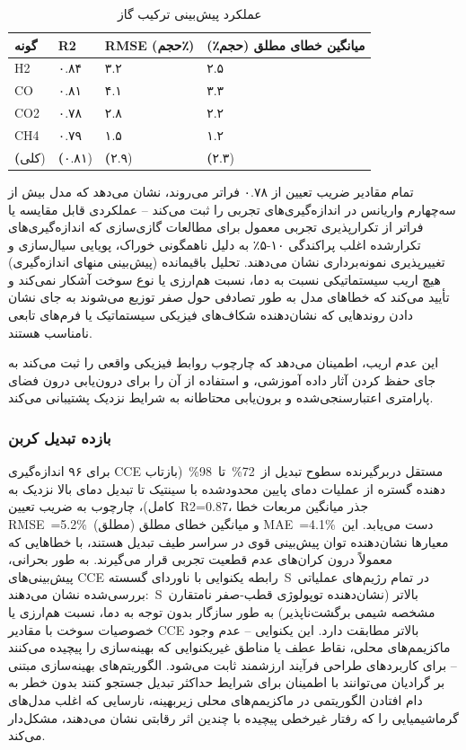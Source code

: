 \documentclass[12pt, a4paper]{article}
\begin{document}
\begin{table}[t]
\centering
\small
\caption{عملکرد پیش‌بینی ترکیب گاز}
\begin{tabularx}{\linewidth}{@{}*{4}{>{\raggedleft\arraybackslash}X}@{}}
\toprule
گونه & R2 & RMSE (حجم٪) & میانگین خطای مطلق (حجم٪) \\
\midrule
H2 & ۰.۸۴ & ۳.۲ & ۲.۵ \\
CO & ۰.۸۱ & ۴.۱ & ۳.۳ \\
CO2 & ۰.۷۸ & ۲.۸ & ۲.۲ \\
CH4 & ۰.۷۹ & ۱.۵ & ۱.۲ \\
\textbf(کلی) & \textbf(۰.۸۱) & \textbf(۲.۹) & \textbf(۲.۳) \\
\bottomrule
\end{tabularx}
\end{table}


تمام مقادیر ضریب تعیین از ۰.۷۸ فراتر می‌روند، نشان می‌دهد که مدل بیش از سه‌چهارم واریانس در اندازه‌گیری‌های تجربی را ثبت می‌کند – عملکردی قابل مقایسه یا فراتر از تکرارپذیری تجربی معمول برای مطالعات گازی‌سازی که اندازه‌گیری‌های تکرارشده اغلب پراکندگی ۱۰-۵٪ به دلیل ناهمگونی خوراک، پویایی سیال‌سازی و تغییرپذیری نمونه‌برداری نشان می‌دهند. تحلیل باقیمانده (پیش‌بینی منهای اندازه‌گیری) هیچ اریب سیستماتیکی نسبت به دما، نسبت هم‌ارزی یا نوع سوخت آشکار نمی‌کند و تأیید می‌کند که خطاهای مدل به طور تصادفی حول صفر توزیع می‌شوند به جای نشان دادن روندهایی که نشان‌دهنده شکاف‌های فیزیکی سیستماتیک یا فرم‌های تابعی نامناسب هستند.

این عدم اریب، اطمینان می‌دهد که چارچوب روابط فیزیکی واقعی را ثبت می‌کند به جای حفظ کردن آثار داده آموزشی، و استفاده از آن را برای درون‌یابی درون فضای پارامتری اعتبارسنجی‌شده و برون‌یابی محتاطانه به شرایط نزدیک پشتیبانی می‌کند.

\subsubsection{بازده تبدیل کربن}

برای ۹۶ اندازه‌گیری CCE مستقل دربرگیرنده سطوح تبدیل از 72\% تا 98\% (بازتاب دهنده گستره از عملیات دمای پایین محدودشده با سینتیک تا تبدیل دمای بالا نزدیک به کامل)، چارچوب به ضریب تعیین R2=0.87، جذر میانگین مربعات خطا RMSE =5.2\% (مطلق) و میانگین خطای مطلق MAE =4.1\% دست می‌یابد. این معیارها نشان‌دهنده توان پیش‌بینی قوی در سراسر طیف تبدیل هستند، با خطاهایی که معمولاً درون کران‌های عدم قطعیت تجربی قرار می‌گیرند. به طور بحرانی، پیش‌بینی‌های CCE رابطه یکنوایی با ناوردای گسسته S در تمام رژیم‌های عملیاتی بررسی‌شده نشان می‌دهند: S بالاتر (نشان‌دهنده توپولوژی قطب-صفر نامتقارن مشخصه شیمی برگشت‌ناپذیر) به طور سازگار بدون توجه به دما، نسبت هم‌ارزی یا خصوصیات سوخت با مقادیر CCE بالاتر مطابقت دارد. این یکنوایی – عدم وجود ماکزیمم‌های محلی، نقاط عطف یا مناطق غیریکنوایی که بهینه‌سازی را پیچیده می‌کنند – برای کاربردهای طراحی فرآیند ارزشمند ثابت می‌شود. الگوریتم‌های بهینه‌سازی مبتنی بر گرادیان می‌توانند با اطمینان برای شرایط حداکثر تبدیل جستجو کنند بدون خطر به دام افتادن الگوریتمی در ماکزیمم‌های محلی زیربهینه، نارسایی که اغلب مدل‌های گرماشیمیایی را که رفتار غیرخطی پیچیده با چندین اثر رقابتی نشان می‌دهند، مشکل‌دار می‌کند.
\end{document}
